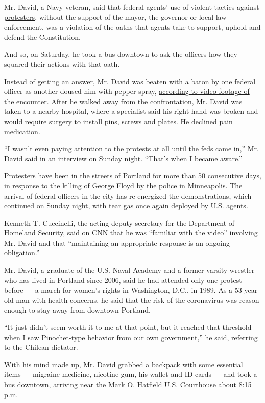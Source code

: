 Mr. David, a Navy veteran, said that federal agents' use of violent
tactics against
\href{https://www.nytimes3xbfgragh.onion/2020/07/22/us/portland-protests-courthouse.html}{protesters},
without the support of the mayor, the governor or local law enforcement,
was a violation of the oaths that agents take to support, uphold and
defend the Constitution.

And so, on Saturday, he took a bus downtown to ask the officers how they
squared their actions with that oath.

Instead of getting an answer, Mr. David was beaten with a baton by one
federal officer as another doused him with pepper spray,
\href{https://twitter.com/PDXzane/status/1284726088187310080}{according
to video footage of the encounter}. After he walked away from the
confrontation, Mr. David was taken to a nearby hospital, where a
specialist said his right hand was broken and would require surgery to
install pins, screws and plates. He declined pain medication.

``I wasn't even paying attention to the protests at all until the feds
came in,'' Mr. David said in an interview on Sunday night. ``That's when
I became aware.''

Protesters have been in the streets of Portland for more than 50
consecutive days, in response to the killing of George Floyd by the
police in Minneapolis. The arrival of federal officers in the city has
re-energized the demonstrations, which continued on Sunday night, with
tear gas once again deployed by U.S. agents.

Kenneth T. Cuccinelli, the acting deputy secretary for the Department of
Homeland Security, said on CNN that he was ``familiar with the video''
involving Mr. David and that ``maintaining an appropriate response is an
ongoing obligation.''

Mr. David, a graduate of the U.S. Naval Academy and a former varsity
wrestler who has lived in Portland since 2006, said he had attended only
one protest before --- a march for women's rights in Washington, D.C.,
in 1989. As a 53-year-old man with health concerns, he said that the
risk of the coronavirus was reason enough to stay away from downtown
Portland.

``It just didn't seem worth it to me at that point, but it reached that
threshold when I saw Pinochet-type behavior from our own government,''
he said, referring to the Chilean dictator.

With his mind made up, Mr. David grabbed a backpack with some essential
items --- migraine medicine, nicotine gum, his wallet and ID cards ---
and took a bus downtown, arriving near the Mark O. Hatfield U.S.
Courthouse about 8:15 p.m.

